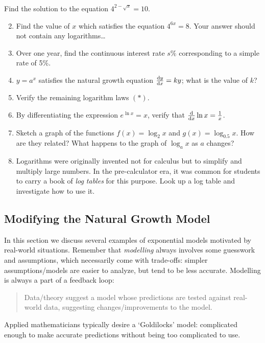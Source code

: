 \begin{exercises}{}{}
	\exstart Find the solution to the equation $4^{2-\sqrt x}=10$.
	\begin{enumerate}\setcounter{enumi}{1}
	  \item Find the value of $x$ which satisfies the equation $4^{6x}=8$. Your answer should not contain any logarithms\ldots
	  
	  \item Over one year, find the continuous interest rate $s\%$ corresponding to a simple rate of 5\%.
	
	  \item $y=a^x$ satisfies the natural growth equation $\diff[y]x=ky$; what is the value of $k$?
	  
		\item Verify the remaining logarithm laws $(\ast)$.
	
	  \item By differentiating the expression $e^{\ln x}=x$, verify that $\diff x\ln x=\frac 1x$.
	  
	  \item Sketch a graph of the functions $f(x)=\log_2x$ and $g(x)=\log_{0.5}x$. How are they related? What happens to the graph of $\log_ax$ as $a$ changes?
	
	  \item Logarithms were originally invented not for calculus but to simplify and multiply large numbers. In the pre-calculator era, it was common for students to carry a book of \emph{log tables} for this purpose. Look up a log table and investigate how to use it.
	\end{enumerate}
\end{exercises}


\clearpage


\subsection{Modifying the Natural Growth Model}

In this section we discuss several examples of exponential models motivated by real-world situations. Remember that \emph{modelling} always involves some guesswork and assumptions, which necessarily come with trade-offs: simpler assumptions/models are easier to analyze, but tend to be less accurate. Modelling is always a part of a feedback loop:
\begin{quote}
	Data/theory suggest a model whose predictions are tested against real-world data, suggesting changes/improvements to the model.
\end{quote}
Applied mathematicians typically desire a `Goldilocks' model: complicated enough to make accurate predictions without being too complicated to use.


